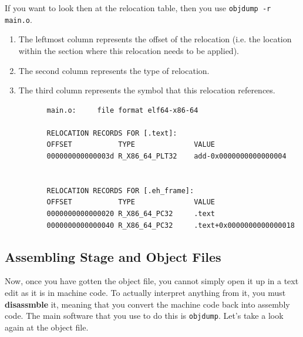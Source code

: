 \documentclass{article}
\begin{document}
      \begin{theorem}
        If you want to look then at the relocation table, then you use \texttt{objdump -r main.o}. 
        \begin{enumerate}
          \item The leftmost column represents the offset of the relocation (i.e. the location within the section where this relocation needs to be applied). 
          \item The second column represents the type of relocation. 
          \item The third column represents the symbol that this relocation references. 
        \end{enumerate}
        \begin{lstlisting}
          main.o:     file format elf64-x86-64

          RELOCATION RECORDS FOR [.text]:
          OFFSET           TYPE              VALUE 
          000000000000003d R_X86_64_PLT32    add-0x0000000000000004


          RELOCATION RECORDS FOR [.eh_frame]:
          OFFSET           TYPE              VALUE 
          0000000000000020 R_X86_64_PC32     .text
          0000000000000040 R_X86_64_PC32     .text+0x0000000000000018
        \end{lstlisting}
      \end{theorem}

  \subsection{Assembling Stage and Object Files}

    Now, once you have gotten the object file, you cannot simply open it up in a text edit as it is in machine code. To actually interpret anything from it, you must \textbf{disassmble} it, meaning that you convert the machine code back into assembly code. The main software that you use to do this is \texttt{objdump}. Let's take a look again at the object file. 
\end{document}
